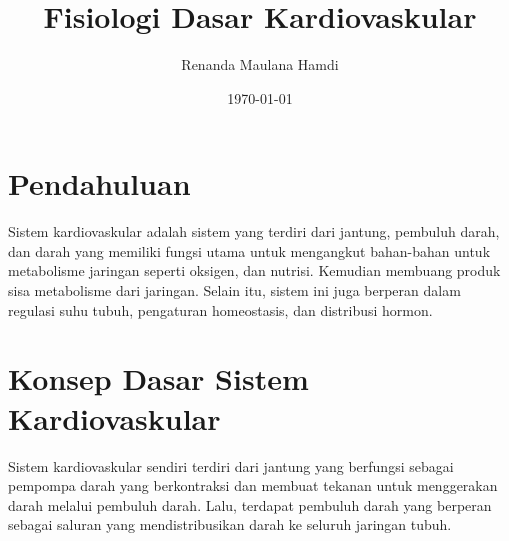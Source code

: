\documentclass[a4paper,12pt]{article}
\title{Fisiologi Dasar Kardiovaskular}
\author{Renanda Maulana Hamdi}
\date{\today}
\begin{document}
\maketitle
\tableofcontents

\newpage

\section{Pendahuluan}
Sistem kardiovaskular adalah sistem yang terdiri dari jantung, pembuluh darah, dan darah yang memiliki fungsi utama untuk mengangkut bahan-bahan untuk metabolisme jaringan seperti oksigen, dan nutrisi. Kemudian 
membuang produk sisa metabolisme dari jaringan. Selain itu, sistem ini juga berperan dalam regulasi suhu tubuh, pengaturan homeostasis, dan distribusi hormon.
\section{Konsep Dasar Sistem Kardiovaskular}
Sistem kardiovaskular sendiri terdiri dari jantung yang berfungsi sebagai pempompa darah yang berkontraksi dan membuat tekanan untuk menggerakan darah melalui pembuluh darah. Lalu, terdapat pembuluh darah yang berperan sebagai saluran yang mendistribusikan darah ke seluruh jaringan tubuh.
\end{document}
